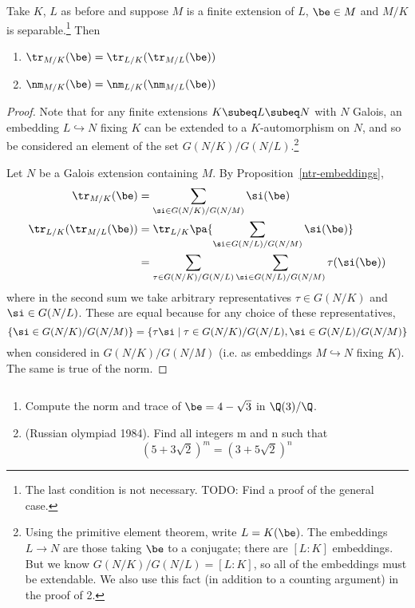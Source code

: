 \begin{pr}
Take $K$, $L$ as before and suppose $M$ is a finite extension of $L$, $\be\in M$ and $M/K$ is separable.\footnote{The last condition is not necessary. TODO: Find a proof of the general case.} Then
\begin{enumerate}
\item
$\tr_{M/K}(\be)=\tr_{L/K}(\tr_{M/L}(\be))$
\item
$\nm_{M/K}(\be)=\nm_{L/K}(\nm_{M/L}(\be))$
\end{enumerate}
\end{pr}
\begin{proof}
Note that for any finite extensions $K\subeq L\subeq N$ with $N$ Galois, an embedding $L\hookrightarrow N$ fixing $K$ can be extended to a $K$-automorphism on $N$, and so be considered an element of the set $G(N/K)/G(N/L)$.\footnote{Using the primitive element theorem, write $L=K(\be)$. The embeddings $L\to N$ are those taking $\be$ to a conjugate; there are $[L:K]$ embeddings. But we know $G(N/K)/G(N/L)=[L:K]$, so all of the embeddings must be extendable. We also use this fact (in addition to a counting argument) in the proof of 2.}

Let $N$ be a Galois extension containing $M$. 
By Proposition~\ref{ntr-embeddings},
\begin{align*}
\tr_{M/K}(\be)&=\sum_{\si\in G(N/K)/G(N/M)}\si(\be)\\
\tr_{L/K}(\tr_{M/L}(\be))&=\tr_{L/K}\pa{
\sum_{\si\in G(N/L)/G(N/M)}\si(\be)
}\\
&=\sum_{\tau\in G(N/K)/G(N/L)}\sum_{\si\in G(N/L)/G(N/M)}\tau(\si(\be))
\end{align*}
where in the second sum we take arbitrary representatives $\tau\in G(N/K)$ and $\si\in G(N/L)$.
These are equal because for any choice of these representatives, 
\[\{\si\in G(N/K)/G(N/M)\}=\{\tau\si\mid \tau\in G(N/K)/G(N/L),\si\in G(N/L)/G(N/M)\}\]
when considered in $G(N/K)/G(N/M)$ (i.e. as embeddings $M\hookrightarrow N$ fixing $K$). 
The same is true of the norm.
\end{proof}

\begin{exr}$\,$
\vspace{0cm}
\begin{enumerate}
\item Compute the norm and trace of $\be = 4-\sqrt{3}$ in $\Q(3)/\Q$.
\item (Russian olympiad 1984). Find all integers m and n such that
\[
    (5 + 3\sqrt{2})^m = (3 + 5\sqrt{2})^n
\]
\end{enumerate}
\end{exr}

